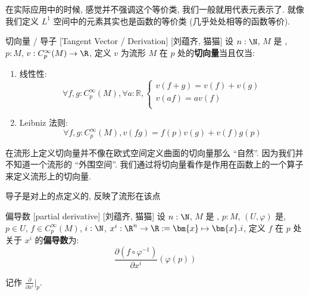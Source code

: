 \documentclass[UTF8]{ctexart}
\begin{document}
        \begin{rmk}
            [刘蕴齐]
            在实际应用中的时候, 感觉并不强调这个等价类, 我们一般就用代表元表示了. 就像我们定义 \(L^1\) 空间中的元素其实也是函数的等价类 (几乎处处相等的函数等价). 
        \end{rmk}

        \begin{dfn}
            {切向量 / 导子}
            [Tangent Vector / Derivation]
            [刘蕴齐, 猫猫]
            设 \(n:\N\), \(M\) 是 , \(p:M\), \(v:C_p^{\infty}(M)\to\R\), 定义 \(v\) 为流形 \(M\) 在 \(p\) 处的\textbf{切向量}当且仅当: 
            \begin{enumerate}
                \item 线性性: 
                \[
                \forall f,g:C_p^{\infty} (M), \forall a:\mathbb{R}, 
                \begin{cases}
                    v (f + g) =v( f ) + v( g )\\
                    v(a f) = av( f )\\
                \end{cases}
                \]
                \item Leibniz 法则: 
                \[\forall f,g:C_p^{\infty} (M), v(fg) = f(p)v(g)+v(f)g(p)\]
            \end{enumerate}
        \end{dfn}

        \begin{rmk}
            [刘蕴齐]
            在流形上定义切向量并不像在欧式空间定义曲面的切向量那么 ``自然''. 因为我们并不知道一个流形的 ``外围空间''. 我们通过将切向量看作是作用在函数上的一个算子来定义流形上的切向量. 
        \end{rmk}

        \begin{rmk}
            [猫猫]
            导子是对 上的点定义的, 反映了流形在该点
        \end{rmk}

        \begin{dfn}
            {偏导数}
            [partial derivative]
            [刘蕴齐, 猫猫]
            设 \(n:\N\), \(M\) 是 , \(p:M\), \((U, \varphi)\) 是, \(p\in U\), \(f\in C_p^{\infty}(M)\), \(i:\N\), \(x^i:\R^n\to\R:=\bm{x}\mapsto\bm{x}.i\), 定义 \(f\) 在 \(p\) 处关于 \(x^i\) 的\textbf{偏导数}为: 
            \[\frac{\partial(f \circ \varphi^{-1})}{\partial x^i}(\varphi(p))\]

            记作 \(\frac{\partial}{\partial x^i}|_p\). 
        \end{dfn}
\end{document}
